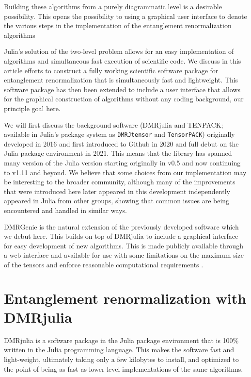 \documentclass{juliacon}
\begin{document}
Building these algorithms from a purely diagrammatic level is a desirable possibility. This opens the possibility to using a graphical user interface to denote the various steps in the implementation of the entanglement renormalization algorithms

Julia's solution of the two-level problem allows for an easy implementation of algorithms and simultaneous fast execution of scientific code. We discuss in this article efforts to construct a fully working scientific software package for entanglement renormalization that is simultaneously fast and lightweight. This software package has then been extended to include a user interface that allows for the graphical construction of algorithms without any coding background, our principle goal here.

We will first discuss the background software (DMRjulia and TENPACK; available in Julia's package system as {\tt DMRJtensor} and {\tt TensorPACK}) originally developed in 2016 and first introduced to Github in 2020 and full debut on the Julia package environment in 2021. This means that the library has spanned many version of the Julia version starting originally in v0.5 and now continuing to v1.11 and beyond. We believe that some choices from our implementation may be interesting to the broader community, although many of the improvements that were introduced here later appeared in this development independently appeared in Julia from other groups, showing that common issues are being encountered and handled in similar ways.

DMRGenie is the natural extension of the previously developed software which we debut here. This builds on top of DMRjulia to include a graphical interface for easy development of new algorithms. This is made publicly available through a web interface and available for use with some limitations on the maximum size of the tensors and enforce reasonable computational requirements \cite{dmrgenie}.



\section{Entanglement renormalization with DMRjulia}

DMRjulia is a software package in the Julia package environment that is 100\% written in the Julia programming language. This makes the software fast and light-weight, ultimately taking only a few kilobytes to install, and optimized to the point of being as fast as lower-level implementations of the same algorithms.
\end{document}
